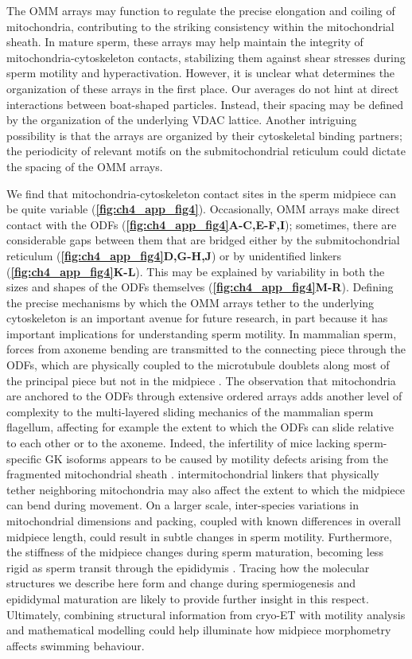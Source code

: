 The OMM arrays may function to regulate the precise elongation and coiling of mitochondria, contributing to the striking consistency within the mitochondrial sheath. In mature sperm, these arrays may help maintain the integrity of mitochondria-cytoskeleton contacts, stabilizing them against shear stresses during sperm motility and hyperactivation. However, it is unclear what determines the organization of these arrays in the first place. Our averages do not hint at direct interactions between boat-shaped particles. Instead, their spacing may be defined by the organization of the underlying VDAC lattice. Another intriguing possibility is that the arrays are organized by their cytoskeletal binding partners; the periodicity of relevant motifs on the submitochondrial reticulum could dictate the spacing of the OMM arrays.

We find that mitochondria-cytoskeleton contact sites in the sperm midpiece can be quite variable (\textbf{\autoref{fig:ch4_app_fig4}}). Occasionally, OMM arrays make direct contact with the ODFs (\textbf{\autoref{fig:ch4_app_fig4}A-C,E-F,I}); sometimes, there are considerable gaps between them that are bridged either by the submitochondrial reticulum (\textbf{\autoref{fig:ch4_app_fig4}D,G-H,J}) or by unidentified linkers (\textbf{\autoref{fig:ch4_app_fig4}K-L}). This may be explained by variability in both the sizes and shapes of the ODFs themselves (\textbf{\autoref{fig:ch4_app_fig4}M-R}). Defining the precise mechanisms by which the OMM arrays tether to the underlying cytoskeleton is an important avenue for future research, in part because it has important implications for understanding sperm motility. In mammalian sperm, forces from axoneme bending are transmitted to the connecting piece through the ODFs, which are physically coupled to the microtubule doublets along most of the principal piece but not in the midpiece \cite{Lesich2014, Leung2021}. The observation that mitochondria are anchored to the ODFs through extensive ordered arrays adds another level of complexity to the multi-layered sliding mechanics of the mammalian sperm flagellum, affecting for example the extent to which the ODFs can slide relative to each other or to the axoneme. Indeed, the infertility of mice lacking sperm-specific GK isoforms appears to be caused by motility defects arising from the fragmented mitochondrial sheath \cite{Chen2017a, Shimada2019}. intermitochondrial linkers that physically tether neighboring mitochondria may also affect the extent to which the midpiece can bend during movement. On a larger scale, inter-species variations in mitochondrial dimensions and packing, coupled with known differences in overall midpiece length, could result in subtle changes in sperm motility. Furthermore, the stiffness of the midpiece changes during sperm maturation, becoming less rigid as sperm transit through the epididymis \cite{Jeulin1996, Miyata2015}. Tracing how the molecular structures we describe here form and change during spermiogenesis and epididymal maturation are likely to provide further insight in this respect. Ultimately, combining structural information from cryo-ET with motility analysis and mathematical modelling could help illuminate how midpiece morphometry affects swimming behaviour.

